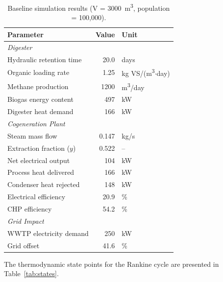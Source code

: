 \documentclass[12pt, letterpaper]{article}
\begin{document}
\begin{table}[H]
  \centering
  \caption{Baseline simulation results (V = \SI{3000}{\cubic\metre}, population = 100,000).}
  \label{tab:baseline}
  \begin{tabular}{@{}lrl@{}}
    \toprule
    \textbf{Parameter} & \textbf{Value} & \textbf{Unit} \\
    \midrule
    \multicolumn{3}{l}{\textit{Digester}} \\
    Hydraulic retention time & 20.0 & days \\
    Organic loading rate & 1.25 & kg VS/(m\textsuperscript{3}$\cdot$day) \\
    Methane production & 1200 & m\textsuperscript{3}/day \\
    Biogas energy content & 497 & kW \\
    Digester heat demand & 166 & kW \\
    \midrule
    \multicolumn{3}{l}{\textit{Cogeneration Plant}} \\
    Steam mass flow & 0.147 & kg/s \\
    Extraction fraction ($y$) & 0.522 & -- \\
    Net electrical output & 104 & kW \\
    Process heat delivered & 166 & kW \\
    Condenser heat rejected & 148 & kW \\
    Electrical efficiency & 20.9 & \% \\
    CHP efficiency & 54.2 & \% \\
    \midrule
    \multicolumn{3}{l}{\textit{Grid Impact}} \\
    WWTP electricity demand & 250 & kW \\
    Grid offset & 41.6 & \% \\
    \bottomrule
  \end{tabular}
\end{table}

The thermodynamic state points for the Rankine cycle are presented in Table~\ref{tab:states}.
\end{document}
